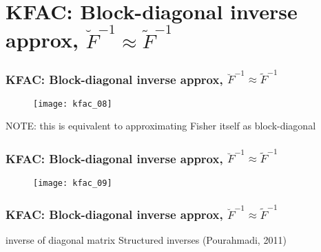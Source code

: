 \section{KFAC: Block-diagonal inverse approx, $\breve{F}^{-1} \approx \tilde{F}^{-1}$}

\begin{frame}
\frametitle{KFAC: Block-diagonal inverse approx, $\breve{F}^{-1} \approx \tilde{F}^{-1}$}
\begin{figure}
    \centering
    \texttt{[image: kfac\_08]}
\end{figure}
NOTE: this is equivalent to approximating Fisher itself as block-diagonal
\end{frame}

\begin{frame}
\frametitle{KFAC: Block-diagonal inverse approx, $\breve{F}^{-1} \approx \tilde{F}^{-1}$}
\begin{figure}
    \centering
    \texttt{[image: kfac\_09]}
\end{figure}
\end{frame}

\begin{frame}
\frametitle{KFAC: Block-diagonal inverse approx, $\breve{F}^{-1} \approx \tilde{F}^{-1}$}
inverse of diagonal matrix
Structured inverses (Pourahmadi, 2011)

\end{frame}
